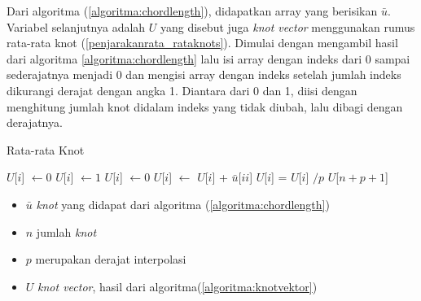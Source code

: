 Dari algoritma (\ref{algoritma:chordlength}), didapatkan array 
yang berisikan $\bar{u}$. Variabel selanjutnya adalah $U$ yang 
disebut juga \textit{knot vector} menggunakan rumus rata-rata 
knot (\ref*{penjarakanrata_rataknots}). Dimulai dengan mengambil
hasil dari algoritma {\ref{algoritma:chordlength}} lalu isi array
dengan indeks dari 0 sampai sederajatnya menjadi 0 dan mengisi
array dengan indeks setelah jumlah indeks dikurangi derajat dengan
angka 1. Diantara dari 0 dan 1, diisi dengan menghitung jumlah knot
didalam indeks yang tidak diubah, lalu dibagi dengan derajatnya.
\begin{algorithm}[H]
  \caption{Rata-rata Knot}
  \begin{algorithmic}[1]
        \State $U$[$i$] $\gets 0$
        \State $U$[$i$] $\gets 1$
      \Else
        \State $U$[$i$] $\gets 0$
          \State $U$[$i$] $\gets$ $U$[$i$] + $\bar{u}$[$ii$]
        \EndFor
        \State $U$[$i$] = $U$[$i$] $/ p$
      \EndIf
    \EndFor
    \State \Return $U$[$n + p + 1$]
  \EndFunction
  \end{algorithmic}
  \label{algoritma:knotvektor}
\end{algorithm}
\begin{itemize}
  \setlength{\itemsep}{0pt}
  \setlength{\parskip}{0pt}
  \setlength{\parsep}{0pt}
  \item $\bar{u}$ \textit{knot} yang didapat dari 
  algoritma (\ref{algoritma:chordlength})
  \item $n$ jumlah \textit{knot}
  \item $p$ merupakan derajat interpolasi
  \item $U$ \textit{knot vector}, hasil dari algoritma(\ref{algoritma:knotvektor})
\end{itemize}

